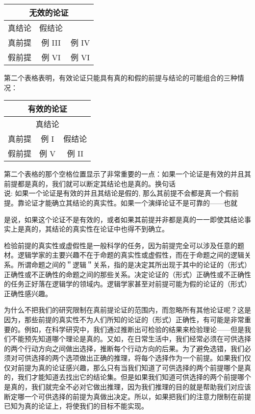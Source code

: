 \begin{center}
\begin{tabular}{|c|c|c|}
\hline
\multicolumn{3}{|c|}{无效的论证} \\
\hline
真结论 & 假结论 &  \\
\hline
真前提 & 例 III & 例 IV \\
\hline
假前提 & 例 VI & 例 VI \\
\hline
\end{tabular}
\end{center}

第二个表格表明，有效论证只能具有真的和假的前提与结论的可能组合的三种情况：

\begin{center}
\begin{tabular}{|c|c|c|}
\hline
\multicolumn{3}{|c|}{有效的论证} \\
\hline
\multicolumn{3}{|c|}{真结论} \\
\hline
真前提 & 例 I & 假结论 \\
\hline
假前提 & 例 V & 例 II \\
\hline
\end{tabular}
\end{center}

第二个表格的那个空格位置显示了非常重要的一点：如果一个论证是有效的并且其前提都是真的，我们就可以断定其结论也是真的。换句话\\
说: 如果一个论证是有效的并且其结论是假的, 那么其前提不会都是真一个假前提。靠论证才能确立其结论的真实性。如果一个演绎论证不是可靠的——也就

是说，如果这个论证不是有效的，或者如果其前提并非都是真的一一即使其结论事实上是真的，其结论的真实性在论证中也得不到确立。

检验前提的真实性或虚假性是一般科学的任务，因为前提完全可以涉及任意的题材。逻辑学家的主要兴趣不在于命题的真实性或虚假性，而在于命题之间的逻辑关系。所谓命题之间的＂逻辑＂关系，指的是决定其所出现于其中的论证的（形式）正确性或不正确性的命题之间的那些关系。决定论证的（形式）正确性或不正确性的任务正好落在逻辑学的领域内。逻辑学家甚至对前提可能为假的论证的（形式）正确性感兴趣。

为什么不把我们的研究限制在真前提论证的范围内，而忽略所有其他论证呢？这是因为，那些前提的真实性不为人们所知的论证的（形式）正确性，有可能是非常重要的。例如，在科学研究中，我们通过推断出可检验的结果来检验理论——但是我们不能预先知道哪个理论是真的。又如，在日常生活中，我们经常必须在可供选择的两个行动方向之间做出选择，推断每个行动方向的后果。为了避免选错，我们必须对可供选择的两个选项做出正确的推理，将每个选择作为一个前提。如果我们仅仅对前提为真的论证感兴趣，那么只有当我们知道了可供选择的两个前提哪个是真的，我们才能知道去找出它的结论集。但是如果我们知道可供选择的两个前提哪个是真的，我们就完全不必对它做出推理，因为我们推理的目的就是帮助我们对应该断定哪一个可供选择的前提为真做出决定。所以，如果把我们的注意力限制在前提已知为真的论证上，将使我们的目标不能实现。


